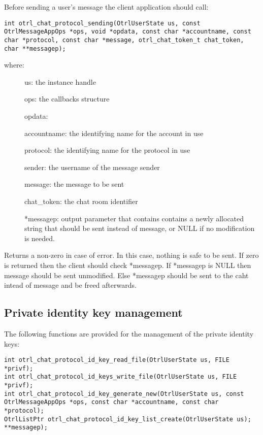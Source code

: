 Before sending a user's message the client application should call:
\begin{lstlisting}
int otrl_chat_protocol_sending(OtrlUserState us, const OtrlMessageAppOps *ops, void *opdata, const char *accountname, const char *protocol, const char *message, otrl_chat_token_t chat_token, char **messagep);
\end{lstlisting}
where:
\begin{description}
  \item[] us: the instance handle
  \item[] ops: the callbacks structure
  \item[] opdata: 
  \item[] accountname: the identifying name for the account in use
  \item[] protocol: the identifying name for the protocol in use
  \item[] sender: the username of the message sender
  \item[] message: the message to be sent
  \item[] chat\_token: the chat room identifier
  \item[] *messagep: output parameter that contains contains a newly allocated string that should be sent instead of message, or NULL if no modification is needed.
\end{description}
Returns a non-zero in case of error. In this case, nothing is safe to be sent.
If zero is returned then the client should check *messagep. If *messagep is NULL then message should be sent unmodified. Else *messagep should be sent to the caht intead of message and be freed afterwards.

\subsection{Private identity key management}
\label{section:private_key_management}
The following functions are provided for the management of the private identity keys:
\begin{lstlisting}
int otrl_chat_protocol_id_key_read_file(OtrlUserState us, FILE *privf);
int otrl_chat_protocol_id_keys_write_file(OtrlUserState us, FILE *privf);
int otrl_chat_protocol_id_key_generate_new(OtrlUserState us, const OtrlMessageAppOps *ops, const char *accountname, const char *protocol);
OtrlListPtr otrl_chat_protocol_id_key_list_create(OtrlUserState us);
**messagep);
\end{lstlisting}

